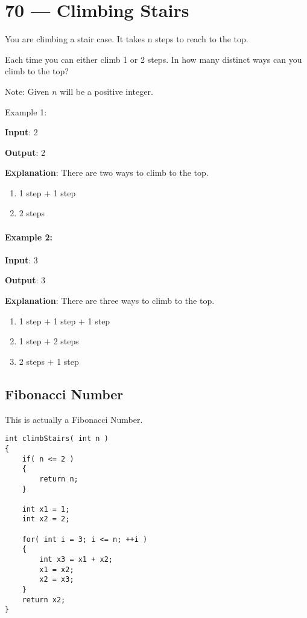 \section{70 --- Climbing Stairs}
You are climbing a stair case. It takes n steps to reach to the top.

Each time you can either climb 1 or 2 steps. In how many distinct ways can you climb to the top?

Note: Given $n$ will be a positive integer.

Example 1:

\begin{flushleft}
\textbf{Input}: 2

\textbf{Output}: 2

\textbf{Explanation}: There are two ways to climb to the top.

\begin{enumerate}
\item 1 step $+$ 1 step
\item 2 steps
\end{enumerate}
\end{flushleft}

\paragraph{Example 2:}

\begin{flushleft}
\textbf{Input}: 3

\textbf{Output}: 3

\textbf{Explanation}: There are three ways to climb to the top.

\begin{enumerate}
\item 1 step $+$ 1 step + 1 step
\item 1 step $+$ 2 steps
\item 2 steps $+$ 1 step
\end{enumerate}
\end{flushleft}

\subsection{Fibonacci Number}
This is actually a Fibonacci Number.

\setcounter{lstlisting}{0}
\begin{lstlisting}[style=customc, caption={Dynamic Programming}]
int climbStairs( int n )
{
    if( n <= 2 )
    {
        return n;
    }

    int x1 = 1;
    int x2 = 2;

    for( int i = 3; i <= n; ++i )
    {
        int x3 = x1 + x2;
        x1 = x2;
        x2 = x3;
    }
    return x2;
}
\end{lstlisting}